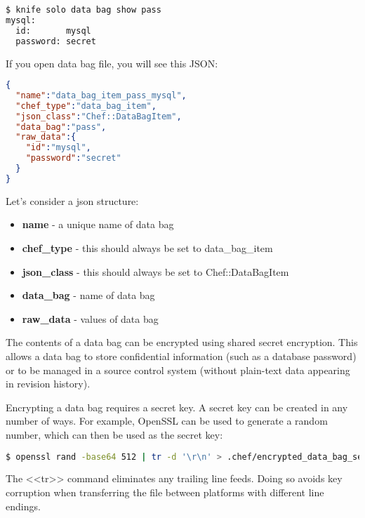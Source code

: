 \begin{lstlisting}[language=Bash,label=lst:my-cloud-chef-databag4,title=my-cloud/Gemfile]
$ knife solo data bag show pass
mysql:
  id:       mysql
  password: secret
\end{lstlisting}

If you open data bag file, you will see this JSON:

\begin{lstlisting}[language=JSON,label=lst:my-cloud-chef-databag10,title=my-cloud/data\_bags/pass/mysql.json]
{
  "name":"data_bag_item_pass_mysql",
  "chef_type":"data_bag_item",
  "json_class":"Chef::DataBagItem",
  "data_bag":"pass",
  "raw_data":{
    "id":"mysql",
    "password":"secret"
  }
}
\end{lstlisting}

Let's consider a json structure:

\begin{itemize}
  \item \textbf{name} - a unique name of data bag
  \item \textbf{chef\_type} - this should always be set to data\_bag\_item
  \item \textbf{json\_class} - this should always be set to Chef::DataBagItem
  \item \textbf{data\_bag} - name of data bag
  \item \textbf{raw\_data} - values of data bag
\end{itemize}

The contents of a data bag can be encrypted using shared secret encryption. This allows a data bag to store confidential information (such as a database password) or to be managed in a source control system (without plain-text data appearing in revision history).

Encrypting a data bag requires a secret key. A secret key can be created in any number of ways. For example, OpenSSL can be used to generate a random number, which can then be used as the secret key:

\begin{lstlisting}[language=Bash,label=lst:my-cloud-chef-databag5,title=my-cloud/Gemfile]
$ openssl rand -base64 512 | tr -d '\r\n' > .chef/encrypted_data_bag_secret
\end{lstlisting}

The <<tr>> command eliminates any trailing line feeds. Doing so avoids key corruption when transferring the file between platforms with different line endings.

